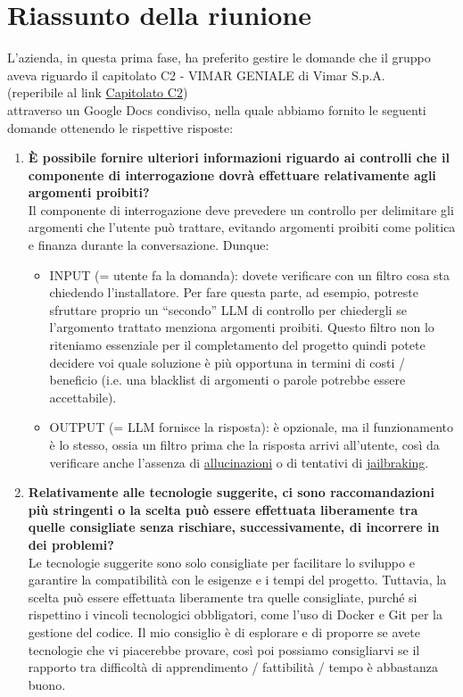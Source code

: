 \section{Riassunto della riunione}
L'azienda, in questa prima fase, ha preferito gestire le domande che il gruppo aveva riguardo il capitolato C2 - VIMAR GENIALE di Vimar S.p.A. \\
(reperibile al link \href{https://www.math.unipd.it/~tullio/IS-1/2024/Progetto/C2.pdf}{Capitolato C2}) \\ attraverso un Google Docs condiviso, nella quale abbiamo fornito le seguenti domande ottenendo le rispettive risposte:

\begin{enumerate}
    \item \textbf{È possibile fornire ulteriori informazioni riguardo ai controlli che il componente di interrogazione dovrà effettuare relativamente agli argomenti proibiti?} \\
     Il componente di interrogazione deve prevedere un controllo per delimitare gli argomenti che l’utente può trattare, evitando argomenti proibiti come politica e finanza durante la conversazione. Dunque: 
    \begin{itemize}
        \item INPUT (= utente fa la domanda): dovete verificare con un filtro cosa sta chiedendo l’installatore. Per fare questa parte, ad esempio, potreste sfruttare proprio un “secondo” LLM di controllo per chiedergli se l’argomento trattato menziona argomenti proibiti. Questo filtro non lo riteniamo essenziale per il completamento del progetto quindi potete decidere voi quale soluzione è più opportuna in termini di costi / beneficio (i.e. una blacklist di argomenti o parole potrebbe essere accettabile).
        \item OUTPUT (= LLM fornisce la risposta): è opzionale, ma il funzionamento è lo stesso, ossia un filtro prima che la risposta arrivi all’utente, così da verificare anche l’assenza di \href{https://www.ibm.com/topics/ai-hallucinations}{allucinazioni} o di tentativi di \href{https://arxiv.org/html/2403.17336v1}{jailbraking}.
    \end{itemize}

    \item \textbf{Relativamente alle tecnologie suggerite, ci sono raccomandazioni più stringenti o la scelta può essere effettuata liberamente tra quelle consigliate senza rischiare, successivamente, di incorrere in dei problemi?} \\
     Le tecnologie suggerite sono solo consigliate per facilitare lo sviluppo e garantire la compatibilità con le esigenze e i tempi del progetto. Tuttavia, la scelta può essere effettuata liberamente tra quelle consigliate, purché si rispettino i vincoli tecnologici obbligatori, come l’uso di Docker e Git per la gestione del codice. Il mio consiglio è di esplorare e di proporre se avete tecnologie che vi piacerebbe provare, così poi possiamo consigliarvi se il rapporto tra difficoltà di apprendimento / fattibilità / tempo è abbastanza buono.


\end{enumerate}

